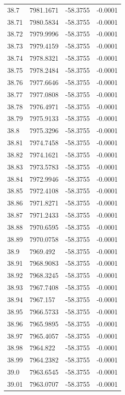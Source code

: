 \begin{table}[H]
\begin{tabular}{llll}
38.7 & 7981.1671 & -58.3755 & -0.0001 \\
38.71 & 7980.5834 & -58.3755 & -0.0001 \\
38.72 & 7979.9996 & -58.3755 & -0.0001 \\
38.73 & 7979.4159 & -58.3755 & -0.0001 \\
38.74 & 7978.8321 & -58.3755 & -0.0001 \\
38.75 & 7978.2484 & -58.3755 & -0.0001 \\
38.76 & 7977.6646 & -58.3755 & -0.0001 \\
38.77 & 7977.0808 & -58.3755 & -0.0001 \\
38.78 & 7976.4971 & -58.3755 & -0.0001 \\
38.79 & 7975.9133 & -58.3755 & -0.0001 \\
38.8 & 7975.3296 & -58.3755 & -0.0001 \\
38.81 & 7974.7458 & -58.3755 & -0.0001 \\
38.82 & 7974.1621 & -58.3755 & -0.0001 \\
38.83 & 7973.5783 & -58.3755 & -0.0001 \\
38.84 & 7972.9946 & -58.3755 & -0.0001 \\
38.85 & 7972.4108 & -58.3755 & -0.0001 \\
38.86 & 7971.8271 & -58.3755 & -0.0001 \\
38.87 & 7971.2433 & -58.3755 & -0.0001 \\
38.88 & 7970.6595 & -58.3755 & -0.0001 \\
38.89 & 7970.0758 & -58.3755 & -0.0001 \\
38.9 & 7969.492 & -58.3755 & -0.0001 \\
38.91 & 7968.9083 & -58.3755 & -0.0001 \\
38.92 & 7968.3245 & -58.3755 & -0.0001 \\
38.93 & 7967.7408 & -58.3755 & -0.0001 \\
38.94 & 7967.157 & -58.3755 & -0.0001 \\
38.95 & 7966.5733 & -58.3755 & -0.0001 \\
38.96 & 7965.9895 & -58.3755 & -0.0001 \\
38.97 & 7965.4057 & -58.3755 & -0.0001 \\
38.98 & 7964.822 & -58.3755 & -0.0001 \\
38.99 & 7964.2382 & -58.3755 & -0.0001 \\
39.0 & 7963.6545 & -58.3755 & -0.0001 \\
39.01 & 7963.0707 & -58.3755 & -0.0001 \\

\end{tabular}
\end{table}
